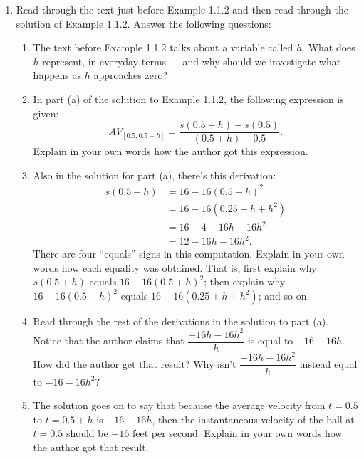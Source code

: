 \documentclass[11pt]{article}
\begin{document}
\begin{enumerate}
    \item Read through the text just before Example 1.1.2 and then read through the solution of Example 1.1.2. Answer the following questions: 
        \begin{enumerate}
            \item The text before Example 1.1.2 talks about a variable called $h$. What does $h$ represent, in everyday terms --- and why should we investigate what happens as $h$ approaches zero? 
            \item In part (a) of the solution to Example 1.1.2, the following expression is given: 
            \begin{equation*}
AV_{[0.5, 0.5+h]} = \frac{s(0.5+h) - s(0.5)}{(0.5+h) - 0.5}\text{.}
\end{equation*}
            Explain in your own words how the author got this expression. 
            \item Also in the solution for part (a), there's this derivation: 
\begin{align*}
s(0.5+h) &=  16 - 16(0.5 + h)^2\\
&=  16 - 16(0.25 + h + h^2)\\
&=  16 - 4 - 16h - 16h^2\\
&=  12 - 16h - 16h^2\text{.}
\end{align*}
        There are four ``equals'' signs in this computation. Explain in your own words how each equality was obtained. That is, first explain why $s(0.5+h)$ equals  $16 - 16(0.5 + h)^2$; then explain why $16 - 16(0.5 + h)^2$ equals $16 - 16(0.25 + h + h^2)$; and so on. 
            \item Read through the rest of the derivations in the solution to part (a). Notice that the author claims that $\dfrac{-16h-16h^2}{h}$ is equal to $-16 - 16h$. How did the author get that result? Why isn't $\dfrac{-16h-16h^2}{h}$ instead equal to $-16-16h^2$? 
            \item The solution goes on to say that because the average velocity from $t=0.5$ to $t=0.5+h$ is $-16 - 16h$, then the instantaneous velocity of the ball at $t=0.5$ should be $-16$ feet per second. Explain in your own words how the author got that result. 
        \end{enumerate}
        

\end{enumerate}
\end{document}
